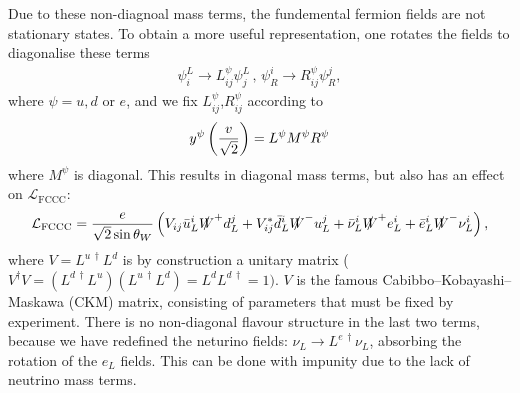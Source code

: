 Due to these non-diagnoal mass terms, the fundemental fermion fields are not stationary states. To obtain a more useful representation, one rotates the fields to diagonalise these terms
\begin{align}
  \psi^L_i\to L^{\psi}_{ij} \psi^L_j \,,\, \psi_R^i \to R^{\psi}_{ij} \psi_R^j,
\end{align}
where $\psi=u,d$ or $e$, and we fix $L^{\psi}_{ij}$,$R^{\psi}_{ij}$ according to
\begin{align}
  y^{\psi} \left({v\over \sqrt{2}}\right)= L^{\psi} M^{\psi} R^{\psi}
\end{align}
where $M^{\psi}$ is diagonal. This results in diagonal mass terms, but also has an effect on $\mathcal{L}_{\text{FCCC}}$:
\begin{align}
  \mathcal{L}_{\text{FCCC}} = {e\over \sqrt{2}\sin\theta_W} \left( V_{ij} \bar{u}_L^i \slashed{W}^+  d_L^j + V_{ij}^* \bar{d}_L^i \slashed{W}^- u_L^j + \bar{\nu}_L^i \slashed{W}^+ e_L^i + \bar{e}_L^i \slashed{W}^- \nu_L^i \right),
  \label{eq:FCCC}
\end{align}
where $V = L^{u\,\dagger} L^d$ is by construction a unitary matrix ($V^{\dagger}V = (L^{d\,\dagger} L^u)(L^{u\,\dagger} L^d) = L^d L^{d\,\dagger} = 1)$. $V$ is the famous Cabibbo–Kobayashi–Maskawa (CKM) matrix, consisting of parameters that must be fixed by experiment. There is no non-diagonal flavour structure in the last two terms, because we have redefined the neturino fields: $\nu_L \to L^{e\,\dagger} \nu_L$, absorbing the rotation of the $e_L$ fields. This can be done with impunity due to the lack of neutrino mass terms.


